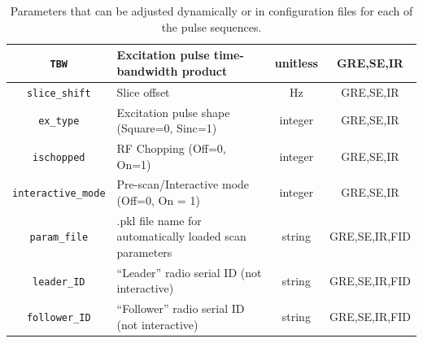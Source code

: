 \documentclass[review]{elsarticle}
\begin{document}
\begin{table}
\begin{tabularx}{\textwidth}{|c|X|c|c|}
	\texttt{TBW} & Excitation pulse time-bandwidth product & unitless & GRE,SE,IR\\ \hline
	\texttt{slice\_shift} & Slice offset & Hz & GRE,SE,IR\\ \hline
	\texttt{ex\_type} & Excitation pulse shape (Square=0, Sinc=1) & integer & GRE,SE,IR\\ \hline
	\texttt{ischopped} & RF Chopping (Off=0, On=1) & integer & GRE,SE,IR\\ \hline
	\texttt{interactive\_mode} & Pre-scan/Interactive mode (Off=0, On = 1) & integer & GRE,SE,IR\\ \hline
	\texttt{param\_file} & .pkl file name for automatically loaded scan parameters & string & GRE,SE,IR,FID\\ \hline
	\texttt{leader\_ID} & ``Leader'' radio serial ID (not interactive) & string & GRE,SE,IR,FID\\ \hline
	\texttt{follower\_ID} & ``Follower'' radio serial ID (not interactive) & string & GRE,SE,IR,FID\\ \hline
	
\end{tabularx}
\caption{Parameters that can be adjusted dynamically or in configuration files for each of the pulse sequences.}
\label{table:sequenceparams}
\end{table}
\end{document}
